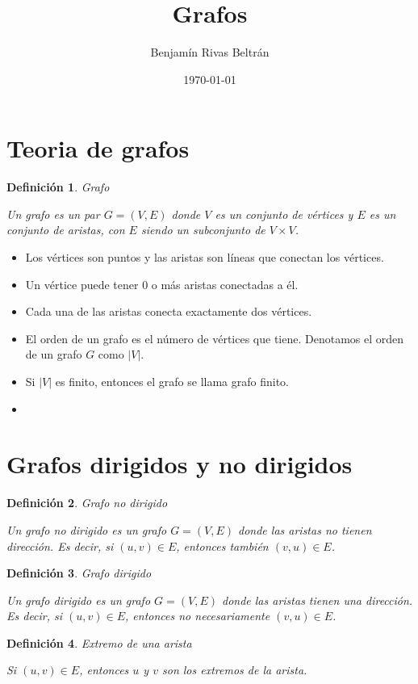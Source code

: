 \documentclass{article}
\title{Grafos}
\author{Benjamín Rivas Beltrán}
\date{\today}
\newtheorem{definition}{Definición}
\begin{document}
\maketitle

\section{Teoria de grafos}

\begin{definition}{Grafo}

  Un grafo es un par $G = (V, E)$ donde $V$ es un conjunto de vértices y $E$ es un conjunto de aristas, con $E$ siendo un subconjunto de $V \times V$.
\end{definition}

\begin{itemize}
  \item Los vértices son puntos y las aristas son líneas que conectan los vértices.
  \item Un vértice puede tener 0 o más aristas conectadas a él.
  \item Cada una de las aristas conecta exactamente dos vértices.
  \item El orden de un grafo es el número de vértices que tiene. Denotamos el orden de un grafo $G$ como $|V|$.
  \item Si $|V|$ es finito, entonces el grafo se llama grafo finito. 
  \item 
\end{itemize}

\section{Grafos dirigidos y no dirigidos}
\begin{definition}{Grafo no dirigido}

  Un grafo no dirigido es un grafo $G = (V, E)$ donde las aristas no tienen dirección. Es decir, si $(u, v) \in E$, entonces también $(v, u) \in E$.
\end{definition}

\begin{definition}{Grafo dirigido}

  Un grafo dirigido es un grafo $G = (V, E)$ donde las aristas tienen una dirección. Es decir, si $(u, v) \in E$, entonces no necesariamente $(v, u) \in E$.
\end{definition}

\begin{definition}{Extremo de una arista}

Si $(u, v) \in E$, entonces $u$ y $v$ son los extremos de la arista.
\end{definition}
\end{document}
